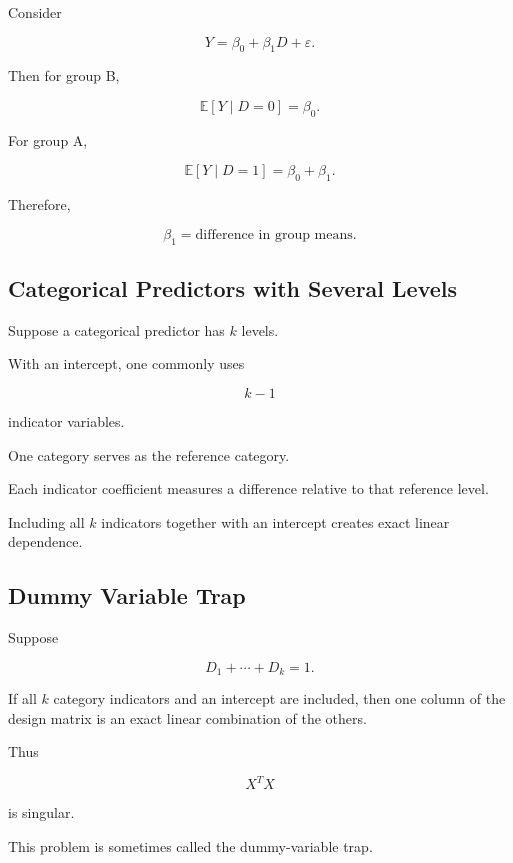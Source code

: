 Consider

\[
\boxed{
Y
=
\beta_0
+
\beta_1D
+
\varepsilon.
}
\]

Then for group B,

\[
\mathbb{E}[Y\mid D=0]
=
\beta_0.
\]

For group A,

\[
\mathbb{E}[Y\mid D=1]
=
\beta_0+\beta_1.
\]

Therefore,

\[
\boxed{
\beta_1
=
\text{difference in group means}.
}
\]

\subsection{Categorical Predictors with Several Levels}
\label{subsec:categorical-predictors-regression}

Suppose a categorical predictor has \(k\) levels.

With an intercept, one commonly uses

\[
\boxed{
k-1
}
\]

indicator variables.

One category serves as the reference category.

Each indicator coefficient measures a difference relative to that
reference level.

Including all \(k\) indicators together with an intercept creates exact
linear dependence.

\subsection{Dummy Variable Trap}
\label{subsec:dummy-variable-trap}

Suppose

\[
D_1+\cdots+D_k=1.
\]

If all \(k\) category indicators and an intercept are included, then one
column of the design matrix is an exact linear combination of the
others.

Thus

\[
X^TX
\]

is singular.

This problem is sometimes called the dummy-variable trap.

